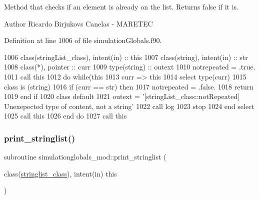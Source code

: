 Method that checks if an element is already on the list. Returns false if it is. 

\begin{DoxyAuthor}{Author}
Ricardo Birjukovs Canelas -\/ M\+A\+R\+E\+T\+EC 
\end{DoxyAuthor}


Definition at line 1006 of file simulation\+Globals.\+f90.


\begin{DoxyCode}
1006     \textcolor{keywordtype}{class}(stringList\_class), \textcolor{keywordtype}{intent(in)} :: this
1007     \textcolor{keywordtype}{class}(string), \textcolor{keywordtype}{intent(in)} :: str
1008     \textcolor{keywordtype}{class}(*), \textcolor{keywordtype}{pointer} :: curr
1009     \textcolor{keywordtype}{type}(string) :: outext
1010     notrepeated = .true.
1011     \textcolor{keyword}{call }this%
1012     \textcolor{keywordflow}{do} \textcolor{keywordflow}{while}(this%
1013         curr => this%
1014         \textcolor{keywordflow}{select type}(curr)
1015 \textcolor{keywordflow}{        class is} (string)
1016             \textcolor{keywordflow}{if} (curr == str) \textcolor{keywordflow}{then}
1017                 notrepeated = .false.
1018                 \textcolor{keywordflow}{return}
1019 \textcolor{keywordflow}{            end if}
1020 \textcolor{keywordflow}{            class default}
1021             outext = \textcolor{stringliteral}{'[stringList\_class::notRepeated] Unexepected type of content, not a string'}
1022             \textcolor{keyword}{call }log%
1023             stop
1024 \textcolor{keywordflow}{        end select}
1025         \textcolor{keyword}{call }this%
1026 \textcolor{keywordflow}{    end do}
1027     \textcolor{keyword}{call }this%
\end{DoxyCode}
\mbox{\label{namespacesimulationglobals__mod_a7adb33aaa9ea0a94c38789c07ff3e787}} 
\subsubsection{\texorpdfstring{print\+\_\+stringlist()}{print\_stringlist()}}
{\footnotesize\ttfamily subroutine simulationglobals\+\_\+mod\+::print\+\_\+stringlist (\begin{DoxyParamCaption}\item[{class(\mbox{\hyperlink{structsimulationglobals__mod_1_1stringlist__class}{stringlist\+\_\+class}}), intent(in)}]{this }\end{DoxyParamCaption})\hspace{0.3cm}{\ttfamily [private]}}




